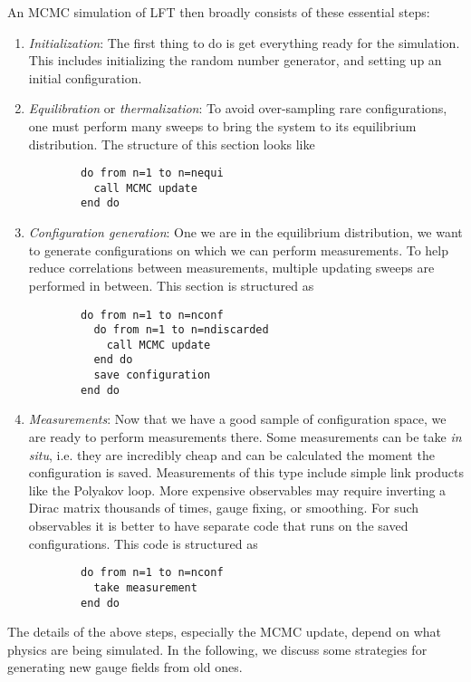 An MCMC simulation of LFT then broadly consists of these essential steps:
\begin{enumerate}
  \item {\it Initialization}: The first thing to do is get everything ready for
        the simulation. This includes initializing the random number generator,
        and setting up an initial configuration.
  \item {\it Equilibration} or {\it thermalization}:
        To avoid over-sampling rare configurations,
        one must perform many sweeps to bring the system to its equilibrium 
        distribution. The structure of this section looks like 
        \begin{verbatim}
        do from n=1 to n=nequi 
          call MCMC update
        end do
        \end{verbatim}
  \item {\it Configuration generation}: One we are in the equilibrium
        distribution, we want to generate configurations on which we can
        perform measurements. To help reduce correlations between
        measurements, multiple updating sweeps are performed in between.
        This section is structured as
        \begin{verbatim}
        do from n=1 to n=nconf
          do from n=1 to n=ndiscarded
            call MCMC update
          end do
          save configuration 
        end do
        \end{verbatim}
  \item {\it Measurements}: Now that we have a good sample of configuration
        space, we are ready to perform measurements there. Some measurements
        can be take {\it in situ}, i.e. they are incredibly cheap and can be
        calculated the moment the configuration is saved. Measurements of this
        type include simple link products like the Polyakov loop. More expensive
        observables may require inverting a Dirac matrix thousands of times, 
        gauge fixing, or smoothing. For such observables it is better to
        have separate code that runs on the saved configurations. This
        code is structured as
        \begin{verbatim}
        do from n=1 to n=nconf
          take measurement 
        end do
        \end{verbatim}
\end{enumerate}

The details of the above steps, especially the MCMC update, depend on what
physics are being simulated. In the following, we discuss some strategies for
generating new gauge fields from old ones.


